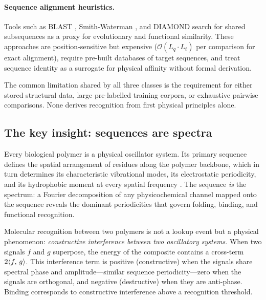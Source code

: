 \paragraph{Sequence alignment heuristics.}
Tools such as BLAST \citep{altschul1990}, Smith-Waterman \citep{smith1981},
and DIAMOND \citep{buchfink2015} search for shared subsequences as a proxy for
evolutionary and functional similarity. These approaches are position-sensitive
but expensive ($\mathcal{O}(L_q \cdot L_t)$ per comparison for exact
alignment), require pre-built databases of target sequences, and treat sequence
identity as a surrogate for physical affinity without formal derivation.

The common limitation shared by all three classes is the requirement for either
stored structural data, large pre-labelled training corpora, or exhaustive
pairwise comparisons. None derives recognition from first physical principles
alone.

\subsection{The key insight: sequences are spectra}

Every biological polymer is a physical oscillator system. Its primary sequence
defines the spatial arrangement of residues along the polymer backbone, which
in turn determines its characteristic vibrational modes, its electrostatic
periodicity, and its hydrophobic moment at every spatial frequency
\citep{voss1992,anastassiou2001,trifonov1980}. The sequence \emph{is} the
spectrum: a Fourier decomposition of any physicochemical channel mapped onto
the sequence reveals the dominant periodicities that govern folding, binding,
and functional recognition.

Molecular recognition between two polymers is not a lookup event but a
physical phenomenon: \emph{constructive interference between two oscillatory
systems}. When two signals $f$ and $g$ superpose, the energy of the composite
contains a cross-term $2\langle f,\, g \rangle$. This interference term is positive
(constructive) when the signals share spectral phase and amplitude---similar
sequence periodicity---zero when the signals are orthogonal, and negative
(destructive) when they are anti-phase. Binding corresponds to constructive
interference above a recognition threshold.

